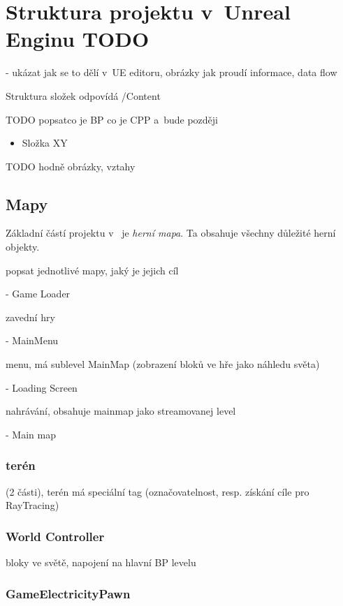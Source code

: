 
\section{Struktura projektu v~Unreal Enginu TODO}
\label{sec:ueStructure}

- ukázat jak se to dělí v~UE editoru, obrázky jak proudí informace, data flow

Struktura složek odpovídá /Content 

TODO  popsatco je BP co je CPP a~bude později 

\begin{itemize}
	\item Složka XY
\end{itemize}


TODO hodně obrázky, vztahy

\subsection{Mapy}

Základní částí projektu v~ je \textit{herní mapa}. Ta obsahuje všechny důležité herní objekty.

popsat jednotlivé mapy, jaký je jejich cíl

- Game Loader

zavední hry

- MainMenu

menu, má sublevel MainMap (zobrazení bloků ve hře jako náhledu světa)

- Loading Screen

nahrávání, obsahuje mainmap jako streamovanej level

- Main map

\subsubsection{terén}

 (2 části), terén má speciální tag (označovatelnost, resp. získání cíle pro RayTracing)

\subsubsection{World Controller}

bloky ve světě, napojení na hlavní BP levelu

\subsubsection{GameElectricityPawn}

